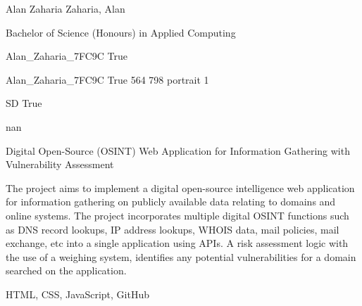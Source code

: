 \documentclass[twoside]{report}
\begin{document}
\begingroup{}\relax



\def\Key{Alan_Zaharia_7FC9C}

{Alan Zaharia}
{Zaharia, Alan}

{Bachelor of Science (Honours) in Applied Computing}

{Alan_Zaharia_7FC9C}
{True}

{Alan_Zaharia_7FC9C}
{True}
{564}
{798}
{portrait}
{1}

{SD}
{True}

{nan}

{Digital Open-Source (OSINT) Web Application for Information Gathering with Vulnerability Assessment}

{The project aims to implement a digital open-source intelligence web application for information gathering on publicly available data relating to domains and online systems. The project incorporates multiple digital OSINT functions such as DNS record lookups, IP address lookups, WHOIS data, mail policies, mail exchange, etc into a single application using APIs.
A risk assessment logic with the use of a weighing system, identifies any potential vulnerabilities for a domain searched on the application.}

{HTML, CSS, JavaScript, GitHub}
\end{document}
